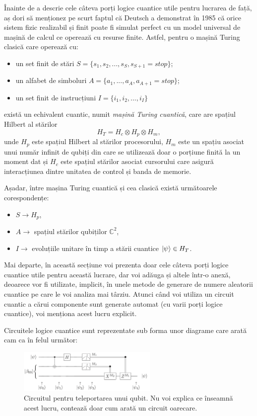 Înainte de a descrie cele câteva porți logice cuantice utile pentru lucrarea de față, aș dori să menționez pe scurt faptul că Deutsch a demonstrat în 1985 \cite{art:Deutsch:QuantumTT:1985} că orice sistem fizic realizabil și finit poate fi simulat perfect cu un model universal de mașină de calcul ce operează cu resurse finite.
Astfel, pentru o mașină Turing clasică care operează cu:
\begin{itemize}
    \item un set finit de stări $S = \{s_1, s_2, ..., s_S, s_{S+1} = {stop}\}$;
    \item un alfabet de simboluri $A = \{a_1, ..., a_A, a_{A+1} = {stop}\}$;
    \item un set finit de instrucțiuni $I = \{i_1, i_2, ... , i_I\}$
\end{itemize}

există un echivalent cuantic, numit \textit{mașină Turing cuantică}, care are spațiul Hilbert al stărilor 
\[
H_T = H_c \otimes H_p \otimes H_m,
\]
unde $H_p$  este spațiul Hilbert al stărilor procesorului, $H_m$ este un spațiu asociat unui număr infinit de qubiți din care se utilizează doar o porțiune finită la un moment dat și $H_c$ este spațiul stărilor asociat cursorului care asigură interacțiunea dintre unitatea de control și banda de memorie.

Așadar, între mașina Turing cuantică și cea clasică există următoarele corespondențe:
\begin{itemize}
    \item $S \rightarrow H_p$,
    \item $A \rightarrow$ spațiul stărilor qubiților $\mathbb{C}^2$,
    \item $I \rightarrow$ evoluțiile unitare în timp a stării cuantice $\ket{\psi} \in H_T$.
\end{itemize}

Mai departe, în această secțiune voi prezenta doar cele câteva porți logice cuantice utile pentru această lucrare, dar voi adăuga și altele într-o anexă, deoarece vor fi utilizate, implicit, în unele metode de generare de numere aleatorii cuantice pe care le voi analiza mai târziu. Atunci când voi utiliza un circuit cuantic a cărui componente sunt generate automat (cu varii porți logice cuantice), voi menționa acest lucru explicit.

Circuitele logice cuantice sunt reprezentate sub forma unor diagrame care arată cam ca în felul următor:
\begin{figure}[H]
    \centering
    \includegraphics[width=0.6\textwidth]{continut/capitol1/figuri/TeleportationCircuit.png}
    \caption{Circuitul pentru teleportarea unui qubit. Nu voi explica ce înseamnă acest lucru, contează doar cum arată un circuit oarecare.}
    \label{fig:CircuitOarecare}
\end{figure}

